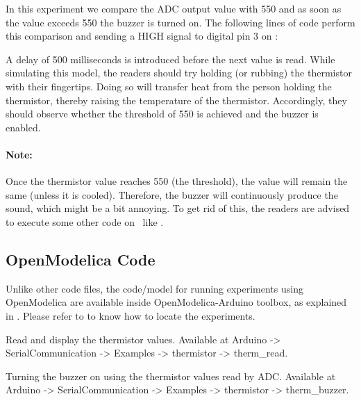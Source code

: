 \begin{enumerate}
        In this experiment we compare the ADC output value with 550
        and as soon as the value exceeds 550 the buzzer is turned on. The following lines of code perform this
        comparison and sending a {HIGH} signal to digital pin 3 on \arduino:
        
        A delay of 500 milliseconds is introduced
        before the next value is read. While simulating this model,
        the readers should try holding (or rubbing) the thermistor with their fingertips.
        Doing so will transfer heat from the person holding the
        thermistor, thereby raising the temperature of the thermistor.
        Accordingly, they should observe whether the threshold of 550 is achieved
        and the buzzer is enabled.

        \paragraph{Note:} Once the thermistor value reaches 550 (the threshold), the value will remain the same
        (unless it is cooled). Therefore, the buzzer will continuously produce the sound, which might be
        a bit annoying. To get rid of this, the readers are advised to
        execute some other code on \arduino\ like .

\end{enumerate}

\subsection{OpenModelica Code}
Unlike other code files, the code/model for running experiments using OpenModelica are
available inside OpenModelica-Arduino toolbox, as explained in .
Please refer to  to know how to locate the experiments.

\label{sec:therm-OpenModelica-code}

\begin{OpenModelicacode}
   {Read and display
    the thermistor values.  Available at
    Arduino -> SerialCommunication ->
    Examples -> thermistor -> therm\_read.}
  \label{OpenModelica:therm-read}
  
\end{OpenModelicacode}

\begin{OpenModelicacode}
  {Turning the buzzer on using the thermistor values read by
    ADC.  Available at
    Arduino -> SerialCommunication ->
    Examples -> thermistor -> therm\_buzzer.}
  \label{OpenModelica:therm-buzzer}
  
\end{OpenModelicacode}
